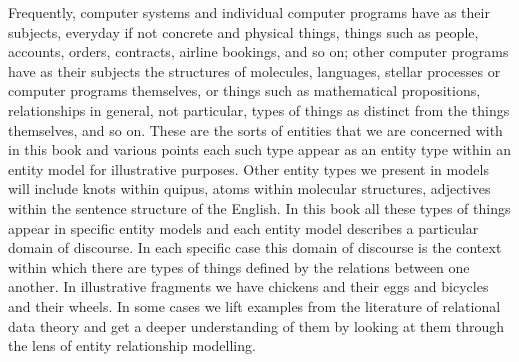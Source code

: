 Frequently, computer systems and individual computer programs have as their subjects, everyday if not concrete and physical things, things such as people, accounts, orders, contracts, airline bookings, and so on; other computer programs have as their subjects the structures of molecules, languages, stellar processes or computer programs themselves, or things such as mathematical propositions, relationships in general, not particular, types of things as distinct from the things themselves, and so on. These are the sorts of entities that we are concerned with in this book and various points each such type appear as an entity type within an entity model for illustrative purposes. Other entity types we present in models will include knots within quipus, atoms within molecular structures, adjectives within the sentence structure of the English. In this book all these types of things appear in specific entity models and each entity model describes a particular domain of discourse. 
In each specific case this domain of discourse is the context within which there are types of things defined by the relations between one another. In illustrative fragments we have chickens and their eggs and bicycles and their wheels. 
In some cases we lift examples from the literature of relational data theory and get a deeper understanding
of them by looking at them through the lens of entity relationship modelling.



